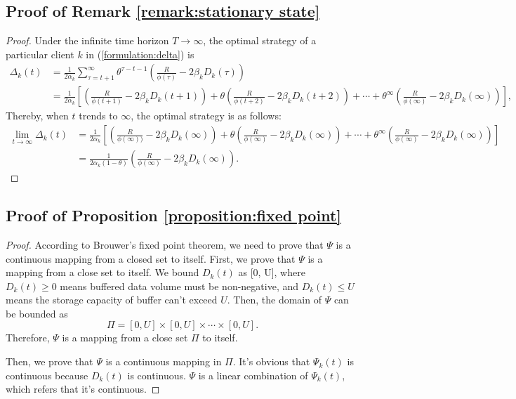 \documentclass{article}
\theoremstyle{plain}
\theoremstyle{definition}
\theoremstyle{remark}
\begin{document}
\subsection{Proof of Remark \ref{remark:stationary state}}
\begin{proof}
  \label{proof:stationary state}
  Under the infinite time horizon $T \rightarrow \infty$, the optimal strategy of a particular client $k$ in (\ref{formulation:delta}) is
  \begin{align}
    \Delta_k(t) & = \frac{1}{2\alpha_k} \sum_{\tau = t + 1}^{\infty} \theta^{\tau - t - 1} \left(\frac{R}{\phi(\tau)} - 2\beta_k D_k(\tau)\right) \\
                & = \frac{1}{2\alpha_k} \left[\left(\frac{R}{\phi(t+1)} - 2\beta_kD_k(t+1)\right) + \theta\left(\frac{R}{\phi(t+2)} - 2\beta_kD_k(t+2)\right) + \cdots + \theta^\infty\left(\frac{R}{\phi(\infty)}-2\beta_kD_k(\infty)\right)\right], 
  \end{align}
  Thereby, when $t$ trends to $\infty$, the optimal strategy is as follows:
  \begin{align}
    \lim_{t\rightarrow\infty} \Delta_k(t) & = \frac{1}{2\alpha_k} \left[\left(\frac{R}{\phi(\infty))} - 2\beta_kD_k(\infty)\right) + \theta\left(\frac{R}{\phi(\infty)} - 2\beta_kD_k(\infty)\right) + \cdots + \theta^\infty\left(\frac{R}{\phi(\infty)}-2\beta_kD_k(\infty)\right)\right] \\
    & = \frac{1}{2\alpha_k(1-\theta)} \left(\frac{R}{\phi(\infty)} - 2\beta_kD_k(\infty)\right).
  \end{align}  
  
\end{proof}

\subsection{Proof of Proposition \ref{proposition:fixed point}}
\begin{proof}
  \label{proof:fixed_point}
  According to Brouwer's fixed point theorem, we need to prove that $\Psi$ is a continuous mapping from a closed set to itself.
  First, we prove that $\Psi$ is a mapping from a close set to itself.
  We bound $D_k(t)$ as [0, U], where $D_k(t) \geq 0$ means buffered data volume must be non-negative, and $D_k(t) \leq U$ means the storage capacity of buffer can't exceed $U$.
  Then, the domain of $\Psi$ can be bounded as
  \begin{equation}
    \Pi = [0, U] \times [0, U] \times \cdots \times [0, U].
  \end{equation}
  Therefore, $\Psi$ is a mapping from a close set $\Pi$ to itself.
  
  Then, we prove that $\Psi$ is a continuous mapping in $\Pi$.
  It's obvious that $\Psi_k(t)$ is continuous because $D_k(t)$ is continuous.
  $\Psi$ is a linear combination of $\Psi_k(t)$, which refers that it's continuous.
\end{proof}
\end{document}
